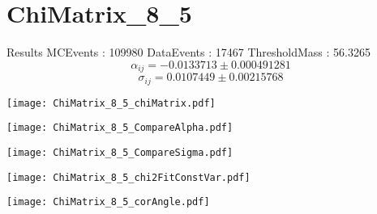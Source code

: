 \documentclass[a4paper,12pt]{article}
\begin{document}
\section{ChiMatrix\_8\_5}
\begin{minipage}{0.49\linewidth} Results \newline
MCEvents : 109980\newline
DataEvents : 17467 \newline
ThresholdMass : 56.3265\\
$$\alpha_{ij} = -0.0133713\pm 0.000491281$$
$$\sigma_{ij} = 0.0107449\pm 0.00215768$$
\end{minipage}\hfill
\begin{minipage}{0.49\linewidth} 
\texttt{[image: ChiMatrix\_8\_5\_chiMatrix.pdf]}\\
\end{minipage}
\hfill
\begin{minipage}{0.49\linewidth} 
\texttt{[image: ChiMatrix\_8\_5\_CompareAlpha.pdf]}\\
\end{minipage}
\hfill
\begin{minipage}{0.49\linewidth} 
\texttt{[image: ChiMatrix\_8\_5\_CompareSigma.pdf]}\\
\end{minipage}
\begin{minipage}{0.49\linewidth} 
\texttt{[image: ChiMatrix\_8\_5\_chi2FitConstVar.pdf]}\\
\end{minipage}
\hfill
\begin{minipage}{0.49\linewidth} 
\texttt{[image: ChiMatrix\_8\_5\_corAngle.pdf]}\\
\end{minipage}
\end{document}
